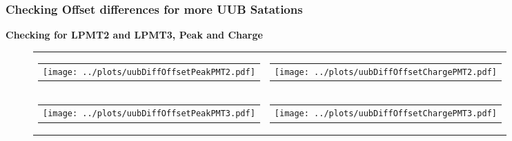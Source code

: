 \documentclass[aspectratio=169]{beamer}
\begin{document}
\begin{frame}
	\frametitle{Checking Offset differences for more UUB Satations}
	{\bf Checking for LPMT2 and LPMT3, Peak and Charge}
	\begin{figure}
		\centering
		\begin{tabularx}{\textwidth}{CC}
			\begin{tabular}{l}
				\texttt{[image: ../plots/uubDiffOffsetPeakPMT2.pdf]}
			\end{tabular}
			&
			\begin{tabular}{l}
				\texttt{[image: ../plots/uubDiffOffsetChargePMT2.pdf]}
			\end{tabular}
			\\
			\begin{tabular}{l}
				\texttt{[image: ../plots/uubDiffOffsetPeakPMT3.pdf]}
			\end{tabular}
			&
			\begin{tabular}{l}
				\texttt{[image: ../plots/uubDiffOffsetChargePMT3.pdf]}
			\end{tabular}
		\end{tabularx}
	\end{figure}
\end{frame}
\end{document}
